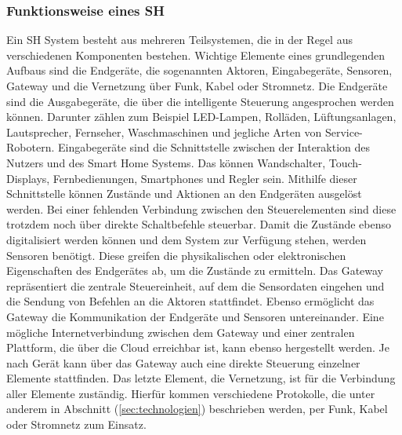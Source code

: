     \subsubsection*{Funktionsweise eines \acl{SH}}
    \label{subsubsec:funktionsweise}
        Ein \acl{SH} System besteht aus mehreren Teilsystemen, die in der Regel aus verschiedenen Komponenten bestehen. 
        Wichtige Elemente eines grundlegenden Aufbaus sind die Endgeräte, die sogenannten Aktoren, Eingabegeräte, 
        Sensoren, Gateway und die Vernetzung über Funk, Kabel oder Stromnetz. Die Endgeräte sind die Ausgabegeräte, die 
        über die intelligente Steuerung angesprochen werden können. Darunter zählen zum Beispiel 
        LED-Lampen, Rolläden, Lüftungsanlagen, Lautsprecher, Fernseher, Waschmaschinen und jegliche Arten von 
        Service-Robotern. Eingabegeräte sind die Schnittstelle zwischen der Interaktion des Nutzers und des 
        Smart Home Systems. Das können Wandschalter, Touch-Displays, Fernbedienungen, Smartphones und Regler sein. 
        Mithilfe dieser Schnittstelle können Zustände und Aktionen an den Endgeräten ausgelöst werden. Bei einer 
        fehlenden Verbindung zwischen den Steuerelementen sind diese trotzdem noch über direkte Schaltbefehle steuerbar. 
        Damit die Zustände ebenso digitalisiert werden können und dem System zur Verfügung stehen, werden Sensoren 
        benötigt. Diese greifen die physikalischen oder elektronischen Eigenschaften des Endgerätes ab, um die 
        Zustände zu ermitteln. Das Gateway repräsentiert die zentrale Steuereinheit, auf dem die Sensordaten 
        eingehen und die Sendung von Befehlen an die Aktoren stattfindet. Ebenso ermöglicht das Gateway die 
        Kommunikation der Endgeräte und Sensoren untereinander. Eine mögliche Internetverbindung zwischen 
        dem Gateway und einer zentralen Plattform, die über die Cloud erreichbar ist, kann ebenso hergestellt werden. 
        Je nach Gerät kann über das Gateway auch eine direkte Steuerung einzelner Elemente stattfinden. Das letzte 
        Element, die Vernetzung, ist für die Verbindung aller Elemente zuständig. Hierfür kommen verschiedene 
        Protokolle, die unter anderem in Abschnitt (\ref{sec:technologien}) beschrieben werden, 
        per Funk, Kabel oder Stromnetz zum Einsatz. %
        \\
